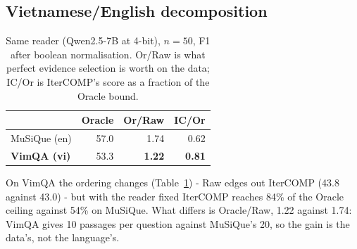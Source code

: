 \documentclass[11pt]{article}
\begin{document}
\subsection{Vietnamese/English decomposition}
\label{app:decomp}

\begin{table}[htbp]
\centering
\small
\begin{tabular}{lrrr}
\toprule
 & Oracle & Or/Raw & IC/Or \\
\midrule
MuSiQue (en) & 57.0 & 1.74 & 0.62 \\
\textbf{VimQA (vi)} & 53.3 & \textbf{1.22} & \textbf{0.81} \\
\bottomrule
\end{tabular}
\caption{Same reader (Qwen2.5-7B at 4-bit), $n=50$, F1 after boolean
normalisation. Or/Raw is what perfect evidence selection is worth on the data;
IC/Or is IterCOMP's score as a fraction of the Oracle bound.}
\label{tab:decomp}
\end{table}

On VimQA the ordering changes (Table~\ref{tab:decomp}) - Raw edges out IterCOMP (43.8 against 43.0) - but
with the reader fixed IterCOMP reaches 84\% of the Oracle ceiling against 54\% on
MuSiQue. What differs is Oracle/Raw, 1.22 against 1.74: VimQA gives 10 passages
per question against MuSiQue's 20, so the gain is the data's, not the language's.
\end{document}
